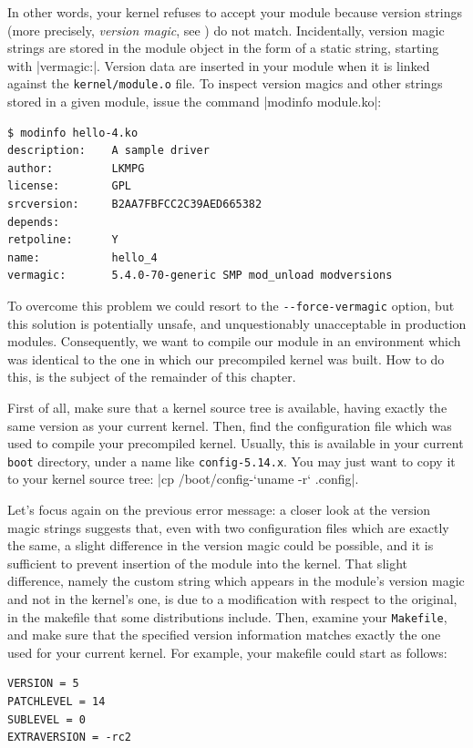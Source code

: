 \documentclass[10pt, oneside]{book}
\begin{document}
In other words, your kernel refuses to accept your module because version strings (more precisely, \textit{version magic}, see ) do not match.
Incidentally, version magic strings are stored in the module object in the form of a static string, starting with \cpp|vermagic:|.
Version data are inserted in your module when it is linked against the \verb|kernel/module.o| file.
To inspect version magics and other strings stored in a given module, issue the command \sh|modinfo module.ko|:

\begin{verbatim}
$ modinfo hello-4.ko
description:    A sample driver
author:         LKMPG
license:        GPL
srcversion:     B2AA7FBFCC2C39AED665382
depends:
retpoline:      Y
name:           hello_4
vermagic:       5.4.0-70-generic SMP mod_unload modversions
\end{verbatim}

To overcome this problem we could resort to the \verb|--force-vermagic| option, but this solution is potentially unsafe, and unquestionably unacceptable in production modules.
Consequently, we want to compile our module in an environment which was identical to the one in which our precompiled kernel was built.
How to do this, is the subject of the remainder of this chapter.

First of all, make sure that a kernel source tree is available, having exactly the same version as your current kernel.
Then, find the configuration file which was used to compile your precompiled kernel.
Usually, this is available in your current \verb|boot| directory, under a name like \verb|config-5.14.x|.
You may just want to copy it to your kernel source tree: \sh|cp /boot/config-`uname -r` .config|.

Let's focus again on the previous error message: a closer look at the version magic strings suggests that, even with two configuration files which are exactly the same, a slight difference in the version magic could be possible, and it is sufficient to prevent insertion of the module into the kernel.
That slight difference, namely the custom string which appears in the module's version magic and not in the kernel's one, is due to a modification with respect to the original, in the makefile that some distributions include.
Then, examine your \verb|Makefile|, and make sure that the specified version information matches exactly the one used for your current kernel.
For example, your makefile could start as follows:

\begin{verbatim}
VERSION = 5
PATCHLEVEL = 14
SUBLEVEL = 0
EXTRAVERSION = -rc2
\end{verbatim}
\end{document}

